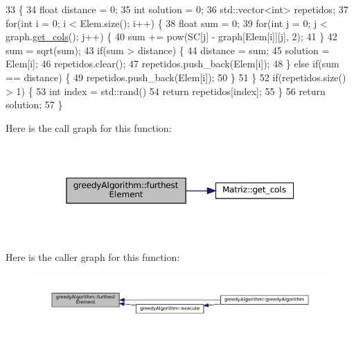 \begin{DoxyCode}
33                                                                              \{
34   \textcolor{keywordtype}{float} distance = 0;
35   \textcolor{keywordtype}{int} solution = 0;
36   std::vector<int> repetidos;
37   \textcolor{keywordflow}{for}(\textcolor{keywordtype}{int} i = 0; i < Elem.size(); i++) \{
38     \textcolor{keywordtype}{float} sum = 0;
39     \textcolor{keywordflow}{for}(\textcolor{keywordtype}{int} j = 0; j < graph.\hyperlink{classMatriz_ad6915f9b31f93230a3ce05d01d23a47b}{get\_cols}(); j++) \{
40       sum += pow(SC[j] - graph[Elem[i]][j], 2);
41     \}
42     sum = sqrt(sum);
43     \textcolor{keywordflow}{if}(sum > distance) \{
44       distance = sum;
45       solution = Elem[i];
46       repetidos.clear();
47       repetidos.push\_back(Elem[i]);
48     \} \textcolor{keywordflow}{else} \textcolor{keywordflow}{if}(sum == distance) \{
49       repetidos.push\_back(Elem[i]);
50     \}
51   \}
52   \textcolor{keywordflow}{if}(repetidos.size() > 1) \{
53     \textcolor{keywordtype}{int} index = std::rand() %
54     \textcolor{keywordflow}{return} repetidos[index];
55   \}
56   \textcolor{keywordflow}{return} solution;
57 \}
\end{DoxyCode}
Here is the call graph for this function\+:
\nopagebreak
\begin{figure}[H]
\begin{center}
\leavevmode
\includegraphics[width=350pt]{classgreedyAlgorithm_afb8dddb24fefb88da82011db8c07e17c_cgraph}
\end{center}
\end{figure}
Here is the caller graph for this function\+:
\nopagebreak
\begin{figure}[H]
\begin{center}
\leavevmode
\includegraphics[width=350pt]{classgreedyAlgorithm_afb8dddb24fefb88da82011db8c07e17c_icgraph}
\end{center}
\end{figure}
\mbox{\label{classgreedyAlgorithm_a1ba2f9ae707c3d68f0af86ea320f80cf}} 
